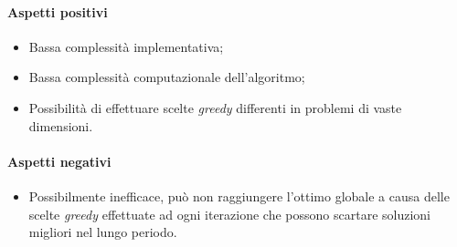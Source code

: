\noindent \paragraph{Aspetti positivi}
\begin{itemize}
    \item Bassa complessità implementativa;
    \item Bassa complessità computazionale dell'algoritmo;
    \item Possibilità di effettuare scelte \textit{greedy} differenti in problemi di vaste dimensioni.
\end{itemize}
\noindent \paragraph{Aspetti negativi}
\begin{itemize}
    \item Possibilmente inefficace, può non raggiungere l'ottimo globale a causa
    delle scelte \textit{greedy} effettuate ad ogni iterazione che possono scartare soluzioni
    migliori nel lungo periodo.
\end{itemize}

